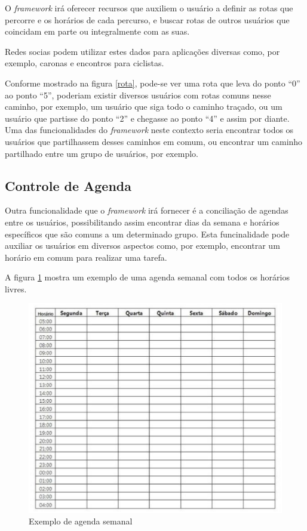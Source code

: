 O \textit{framework} irá oferecer recursos que auxiliem o usuário a definir as rotas que percorre e os horários de cada percurso, e buscar rotas de outros usuários que coincidam em parte ou integralmente com as suas.

Redes socias podem utilizar estes dados para aplicações diversas como, por exemplo, caronas e encontros para ciclistas.

Conforme mostrado na figura \ref{rota}, pode-se ver uma rota que leva do ponto ``0'' ao ponto ``5'', poderiam existir diversos usuários com rotas comuns nesse caminho, por exemplo, um usuário que siga todo o caminho traçado, ou um usuário que partisse do ponto ``2'' e chegasse ao ponto ``4'' e assim por diante. Uma das funcionalidades do \textit{framework} neste contexto seria encontrar todos os usuários que partilhassem desses caminhos em comum, ou encontrar um caminho partilhado entre um grupo de usuários, por exemplo.

\subsection{Controle de Agenda}

Outra funcionalidade que o \textit{framework} irá fornecer é a conciliação de agendas entre os usuários, possibilitando assim encontrar dias da semana e horários específicos que são comuns a um determinado grupo. Esta funcinalidade pode auxiliar os usuários em diversos aspectos como, por exemplo, encontrar um horário em comum para realizar uma tarefa.

A figura \ref{agenda semanal} mostra um exemplo de uma agenda semanal com todos os horários livres.

\begin{figure}[!h]
	\centering
	\includegraphics[scale=0.55]{figuras/capitulo5/agenda_semanal.eps}
	\caption[Exemplo de agenda semanal]{Exemplo de agenda semanal\footnotemark}
	\label{agenda semanal}
\end{figure}


